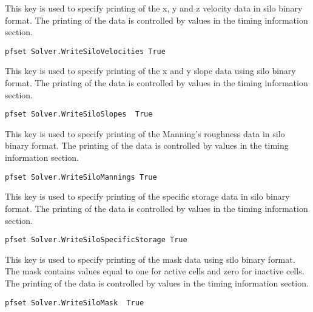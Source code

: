 {
This key is used to specify printing of the x, y and z
velocity data in silo binary format.  The printing of the data is controlled by
values in the timing information section.
}
\begin{display}\begin{verbatim}
pfset Solver.WriteSiloVelocities True
\end{verbatim}\end{display}

{
This key is used to specify printing of the x and y slope data using silo binary format.
The printing of the data is controlled by values in the
timing information section.  
}
\begin{display}\begin{verbatim}
pfset Solver.WriteSiloSlopes  True
\end{verbatim}\end{display}

{
This key is used to specify printing of the Manning's roughness data in silo binary format.
The printing of the data is controlled by values in the
timing information section.
}
\begin{display}\begin{verbatim}
pfset Solver.WriteSiloMannings True
\end{verbatim}\end{display}

{
This key is used to specify printing of the specific storage data in silo binary format.
The printing of the data is controlled by values in the
timing information section.
}
\begin{display}\begin{verbatim}
pfset Solver.WriteSiloSpecificStorage True
\end{verbatim}\end{display}

{
This key is used to specify printing of the mask data using silo binary format.  The mask contains values equal to one for active cells and zero for inactive cells. 
The printing of the data is controlled by values in the
timing information section.  
}
\begin{display}\begin{verbatim}
pfset Solver.WriteSiloMask  True
\end{verbatim}\end{display}

